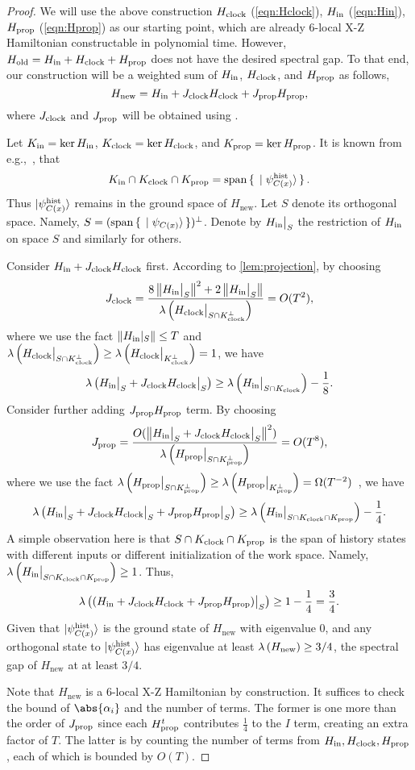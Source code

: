 \begin{proof}
We will use the above construction $H_{\mathrm{clock}}$ (\cref{eqn:Hclock}), $H_{\mathrm{in}}$ (\cref{eqn:Hin}), $H_{\mathrm{prop}}$ (\cref{eqn:Hprop}) as our starting point, which are already 6-local X-Z Hamiltonian constructable in polynomial time. However, $H_{\mathrm{old}}=H_{\mathrm{in}} + H_{\mathrm{clock}} + H_{\mathrm{prop}}$ does not have the desired spectral gap. To that end, our construction will be a weighted sum of $H_{\mathrm{in}}$, $H_{\mathrm{clock}}$, and $H_{\mathrm{prop}}$ as follows,
\begin{equation}
    H_{\mathrm{new}}= H_{\mathrm{in}} + J_{\mathrm{clock}} H_{\mathrm{clock}} + J_{\mathrm{prop}} H_{\mathrm{prop}},
\end{equation}
where $J_{\mathrm{clock}}$ and $J_{\mathrm{prop}}$ will be obtained using .

Let $K_{\mathrm{in}}=\ker H_{\mathrm{in}}$, $K_{\mathrm{clock}}=\ker H_{\mathrm{clock}}$, and $K_{\mathrm{prop}}=\ker H_{\mathrm{prop}}$. It is known from e.g.,~\cite{kitaev2002classical}, that
\[
   K_{\mathrm{in}} \cap K_{\mathrm{clock}} \cap K_{\mathrm{prop}} = \operatorname*{\operatorname{span}}\set{\ket{\psi_{C(x)}^{\mathrm{hist}}}}.
\]
Thus $\ket{\psi_{C(x)}^{\mathrm{hist}}}$ remains in the ground space of $H_{\mathrm{new}}$. Let $S$ denote its orthogonal space. Namely, $S=(\operatorname*{\operatorname{span}}\set{\ket{\psi_{C(x)}}})^\bot$.
Denote by $H_{\mathrm{in}}\big|_S$ the restriction of $H_{\mathrm{in}}$ on space $S$ and similarly for others.

Consider $H_{\mathrm{in}} + J_{\mathrm{clock}}H_{\mathrm{clock}}$ first. According to \cref{lem:projection}, by choosing
\[
  J_{\mathrm{clock}} = \frac{8\left\lVert H_{\mathrm{in}}\big|_S\right\rVert^2 + 2 \left\lVert H_{\mathrm{in}}\big|_S\right\rVert}{{\lambda \left (H_{\mathrm{clock}}\big|_{S\cap K_{\mathrm{clock}}^\bot} \right)}} = O(T^2),
\]
where we use the fact $\left\lVert H_{\mathrm{in}}|_S\right\rVert\leq T$ and ${\lambda \left (H_{\mathrm{clock}}\big|_{S\cap K_{\mathrm{clock}}^\bot} \right)}\geq {\lambda \left (H_{\mathrm{clock}}\big|_{K_{\mathrm{clock}}^\bot} \right)}=1$,
we have
\[
 {\lambda \left (H_{\mathrm{in}}\big|_S + J_{\mathrm{clock}}H_{\mathrm{clock}}\big|_S \right)}\geq {\lambda \left (H_{\mathrm{in}}\big|_{S\cap K_{\mathrm{clock}}} \right)} - \frac{1}{8}.
\]
Consider further adding $J_{\mathrm{prop}}H_{\mathrm{prop}}$ term.  By choosing
\[
 J_{\mathrm{prop}}= \frac{O(\left\lVert H_{\mathrm{in}}\big|_S + J_{\mathrm{clock}}H_{\mathrm{clock}}\big|_S\right\rVert^2)}{{\lambda \left (H_{\mathrm{prop}}\big|_{S \cap K_{\mathrm{prop}}^\bot} \right)}}= O(T^8),
\]
where we use the fact ${\lambda \left (H_{\mathrm{prop}}\big|_{S\cap K_{\mathrm{prop}}^\bot} \right)}\geq {\lambda \left (H_{\mathrm{prop}}\big|_{K_{\mathrm{prop}}^\bot} \right)}=\Omega(T^{-2})$~\cite{kitaev2002classical}, we have  
\[
 {\lambda \left (H_{\mathrm{in}}\big|_S + J_{\mathrm{clock}}H_{\mathrm{clock}}\big|_S + J_{\mathrm{prop}}H_{\mathrm{prop}}\big|_S \right)} \geq {\lambda \left (H_{\mathrm{in}}\big|_{S \cap K_{\mathrm{clock}}\cap K_{\mathrm{prop}}} \right)} - \frac{1}{4}.
\]
A simple observation here is that $S \cap K_{\mathrm{clock}} \cap K_{\mathrm{prop}}$ is the span of history states with different inputs or different initialization of the work space. Namely, ${\lambda \left (H_{\mathrm{in}}\big|_{S \cap K_{\mathrm{clock}} \cap K_{\mathrm{prop}}} \right)} \geq 1$. Thus,
\[
  {\lambda \left ((H_{\mathrm{in}} + J_{\mathrm{clock}}H_{\mathrm{clock}} + J_{\mathrm{prop}}H_{\mathrm{prop}})\big|_S \right)} \geq 1- \frac{1}{4}=\frac{3}{4}.
\]
Given that $\ket{\psi_{C(x)}^{\mathrm{hist}}}$ is the ground state of $H_{\mathrm{new}}$ with eigenvalue 0, and any orthogonal state to $\ket{\psi_{C(x)}^{\mathrm{hist}}}$ has eigenvalue at least ${\lambda \left (H_{\mathrm{new}} \right)}\geq 3/4$, the spectral gap of $H_{\mathrm{new}}$ at at least $3/4$.

Note that $H_{\mathrm{new}}$ is a 6-local X-Z Hamiltonian by construction. It suffices to check the bound of $\abs{\alpha_i}$ and the number of terms. The former is one more than the order of $J_{\mathrm{prop}}$ since each $H_{\mathrm{prop}}^t$ contributes $\frac{1}{4}$ to the $I$ term, creating an extra factor of $T$. The latter is by counting the number of terms from $H_{\mathrm{in}}, H_{\mathrm{clock}}, H_{\mathrm{prop}}$, each of which is bounded by $O(T)$.
\end{proof}

